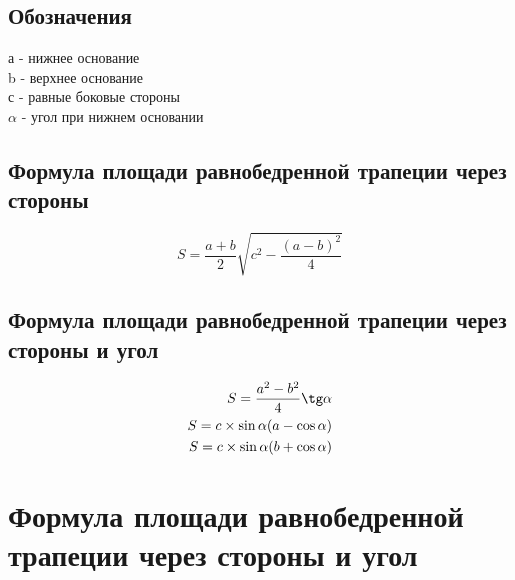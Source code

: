 \documentclass[a4paper,12pt]{article}
\begin{document}
\subsection{Обозначения}

а - нижнее основание \\
b - верхнее основание \\
с - равные боковые стороны \\
$\alpha$ - угол при нижнем основании

\subsection{Формула площади равнобедренной трапеции через стороны}

\[ S = \frac{a + b}{2}\sqrt{c^2 - \frac{(a - b)^2}{4}} \]

\subsection{Формула площади равнобедренной трапеции через стороны и угол}

\begin{align*}
S = \frac{a^2 - b^2}{4}\tg\alpha \\
S = c \times \sin\alpha(a - \cos\alpha) \\
S = c \times \sin\alpha(b + \cos\alpha)
\end{align*}

\newpage
\section{Формула площади равнобедренной трапеции через стороны и угол}
\end{document}
